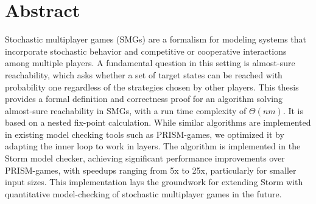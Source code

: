 \chapter*{\centering Abstract}
Stochastic multiplayer games (SMGs) are a formalism for modeling systems that incorporate stochastic behavior and competitive or cooperative interactions among multiple players. A fundamental question in this setting is almost-sure reachability, which asks whether a set of target states can be reached with probability one regardless of the strategies chosen by other players.
This thesis provides a formal definition and correctness proof for an algorithm solving almost-sure reachability in SMGs, with a run time complexity of $\Theta(nm)$. It is based on a nested fix-point calculation. While similar algorithms are implemented in existing model checking tools such as PRISM-games, we optimized it by adapting the inner loop to work in layers. The algorithm is implemented in the Storm model checker, achieving significant performance improvements over PRISM-games, with speedups ranging from 5x to 25x, particularly for smaller input sizes. This implementation lays the groundwork for extending Storm with quantitative model-checking of stochastic multiplayer games in the future.
